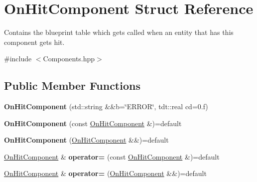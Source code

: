 \hypertarget{struct_on_hit_component}{}\section{On\+Hit\+Component Struct Reference}
\label{struct_on_hit_component}


Contains the blueprint table which gets called when an entity that has this component gets hit.  




{\ttfamily \#include $<$Components.\+hpp$>$}

\subsection*{Public Member Functions}
\begin{DoxyCompactItemize}
\item 
{\bfseries On\+Hit\+Component} (std\+::string \&\&b=\char`\"{}E\+R\+R\+OR\char`\"{}, tdt\+::real cd=0.f)\hypertarget{struct_on_hit_component_ae624f7230c9650e7fa7c6b45cb7a8a49}{}\label{struct_on_hit_component_ae624f7230c9650e7fa7c6b45cb7a8a49}

\item 
{\bfseries On\+Hit\+Component} (const \hyperlink{struct_on_hit_component}{On\+Hit\+Component} \&)=default\hypertarget{struct_on_hit_component_a26ed54d5362548e20b05385c0f1c9f70}{}\label{struct_on_hit_component_a26ed54d5362548e20b05385c0f1c9f70}

\item 
{\bfseries On\+Hit\+Component} (\hyperlink{struct_on_hit_component}{On\+Hit\+Component} \&\&)=default\hypertarget{struct_on_hit_component_ade424965cf5910525d2a419533a57c86}{}\label{struct_on_hit_component_ade424965cf5910525d2a419533a57c86}

\item 
\hyperlink{struct_on_hit_component}{On\+Hit\+Component} \& {\bfseries operator=} (const \hyperlink{struct_on_hit_component}{On\+Hit\+Component} \&)=default\hypertarget{struct_on_hit_component_afed8a7f49f7592e6041eb074ad0bd46e}{}\label{struct_on_hit_component_afed8a7f49f7592e6041eb074ad0bd46e}

\item 
\hyperlink{struct_on_hit_component}{On\+Hit\+Component} \& {\bfseries operator=} (\hyperlink{struct_on_hit_component}{On\+Hit\+Component} \&\&)=default\hypertarget{struct_on_hit_component_af03cc5bbb044cf1f30beb7908248ff9e}{}\label{struct_on_hit_component_af03cc5bbb044cf1f30beb7908248ff9e}

\end{DoxyCompactItemize}
